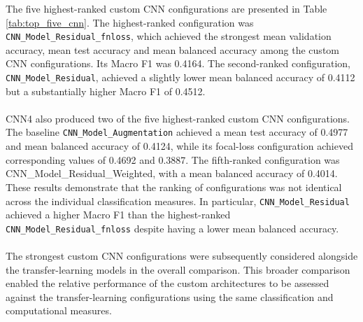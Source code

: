 \documentclass[12pt, a4paper]{report}
\begin{document}
				The five highest-ranked custom CNN configurations are presented in Table \ref{tab:top_five_cnn}. The highest-ranked configuration was \texttt{CNN\_Model\_Residual\_fnloss}, which achieved the strongest mean validation accuracy, mean test accuracy and mean balanced accuracy among the custom CNN configurations. Its Macro F1 was 0.4164. The second-ranked configuration, \texttt{CNN\_Model\_Residual}, achieved a slightly lower mean balanced accuracy of 0.4112 but a substantially higher Macro F1 of 0.4512.\\\\
				CNN4 also produced two of the five highest-ranked custom CNN configurations. The baseline \texttt{CNN\_Model\_Augmentation} achieved a mean test accuracy of 0.4977 and mean balanced accuracy of 0.4124, while its focal-loss configuration achieved corresponding values of 0.4692 and 0.3887. The fifth-ranked configuration was CNN\_Model\_Residual\_Weighted, with a mean balanced accuracy of 0.4014. These results demonstrate that the ranking of configurations was not identical across the individual classification measures. In particular, \texttt{CNN\_Model\_Residual} achieved a higher Macro F1 than the highest-ranked \texttt{CNN\_Model\_Residual\_fnloss} despite having a lower mean balanced accuracy.\\\\
				The strongest custom CNN configurations were subsequently considered alongside the transfer-learning models in the overall comparison. This broader comparison enabled the relative performance of the custom architectures to be assessed against the transfer-learning configurations using the same classification and computational measures.\\
				\setlength{\tabcolsep}{3pt}
\end{document}
